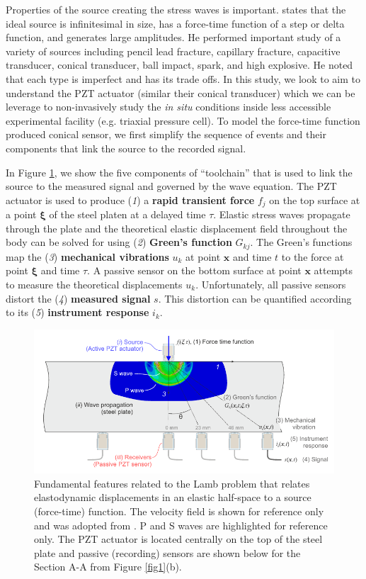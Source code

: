 \documentclass[preprint,3p, 11pt,authoryear]{elsarticle}
\begin{document}
Properties of the source creating the stress waves is important. \citet{Breckenridge1990} states that the ideal source is infinitesimal in size, has a force-time function of a step or delta function, and generates large amplitudes. He performed important study of a variety of sources including pencil lead fracture, capillary fracture, capacitive transducer, conical transducer, ball impact, spark, and high explosive. He noted that each type is imperfect and has its trade offs. In this study, we look to aim to understand the PZT actuator (similar their conical transducer) which we can be leverage to non-invasively study the \textit{in situ} conditions inside less accessible experimental facility (e.g. triaxial pressure cell). To model the force-time function produced conical sensor, we first simplify the sequence of events and their components that link the source to the recorded signal.

In Figure \ref{fig2}, we show the five components of ``toolchain'' that is used to link the source to the measured signal and governed by the wave equation. The PZT actuator is used to produce (\textit{1}) a \textbf{rapid transient force} $f_{j}$ on the top surface at a point $\mathbf{\xi}$ of the steel platen at a delayed time $\tau$. Elastic stress waves propagate through the plate and the theoretical elastic displacement field throughout the body can be solved for using (\textit{2}) \textbf{Green's function} $G_{kj}$. The Green's functions map the (\textit{3}) \textbf{mechanical vibrations} $u_{k}$ at point $\mathbf{x}$ and time $t$ to the force at point $\mathbf{\xi}$ and time $\tau$. A passive sensor on the bottom surface at point $\mathbf{x}$ attempts to measure the theoretical displacements $u_{k}$. Unfortunately, all passive sensors distort the (\textit{4}) \textbf{measured signal}  $s$.  This distortion can be quantified according to its (\textit{5}) \textbf{instrument response} $i_{k}$. 

\begin{figure}[h]
     	\centering
\includegraphics[scale= 1.0]{FIG2.pdf} 
\caption{Fundamental features related to the Lamb problem that relates elastodynamic displacements in an elastic half-space to a source (force-time) function. The velocity field is shown for reference only and was adopted from \citet{Selvadurai2019}. P and S waves are highlighted for reference only. The PZT actuator is located centrally on the top of the steel plate and passive (recording) sensors are shown below for the Section A-A from Figure \ref{fig1}(b).}
	\label{fig2} 
\end{figure}
\end{document}
